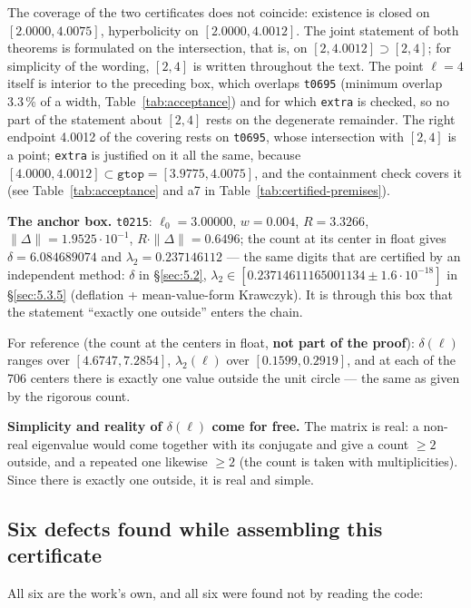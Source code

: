 The coverage of the two certificates does not coincide: existence is
closed on $[2.0000, 4.0075]$, hyperbolicity on $[2.0000, 4.0012]$. The joint
statement of both theorems is formulated on the intersection, that is, on
$[2, 4.0012] \supset [2, 4]$; for simplicity of the wording, $[2, 4]$ is written
throughout the text. The point $\ell = 4$ itself is interior to the preceding box, which overlaps
\texttt{t0695} (minimum overlap 3.3\,\% of a width,
Table~\ref{tab:acceptance}) and for which
\texttt{extra} is checked, so no part of the statement about $[2,4]$ rests on
the degenerate remainder. The right endpoint 4.0012 of the covering rests on \texttt{t0695}, whose intersection with $[2,4]$ is a point; \texttt{extra} is justified on it all the same, because $[4.0000, 4.0012] \subset \texttt{gtop} = [3.9775, 4.0075]$, and the containment check covers it (see Table~\ref{tab:acceptance} and a7 in Table~\ref{tab:certified-premises}).

\textbf{The anchor box.} \texttt{t0215}: $\ell_{0} = 3.00000$, $w = 0.004$, $R = 3.3266$,
$\|\Delta\| = 1.9525\cdot 10^{-1}$, $R\cdot \|\Delta\| = 0.6496$; the count at its center in float
gives $\delta = 6.084689074$ and $\lambda_{2} = 0.237146112$ --- the same digits that are
certified by an independent method: $\delta$ in \S\ref{sec:5.2}, $\lambda_{2} \in
[0.23714611165001134 \pm 1.6\cdot 10^{-18}]$ in \S\ref{sec:5.3.5} (deflation + mean-value-form
Krawczyk). It is through this box that the statement ``exactly one outside''
enters the chain.

For reference (the count at the centers in float, \textbf{not part of the
proof}): $\delta(\ell)$ ranges over $[4.6747, 7.2854]$, $\lambda_{2}(\ell)$ over $[0.1599,
0.2919]$, and at each of the 706 centers there is exactly one value outside
the unit circle --- the same as given by the rigorous count.

\textbf{Simplicity and reality of $\delta(\ell)$ come for free.} The matrix is real: a
non-real eigenvalue would come together with its conjugate and give a
count $\ge 2$ outside, and a repeated one likewise $\ge 2$ (the count is taken
with multiplicities). Since there is exactly one outside, it is real and
simple.



\subsection{Six defects found while assembling this certificate}\label{sec:4.9}

All six are the work's own, and all six were found not by reading the
code:

